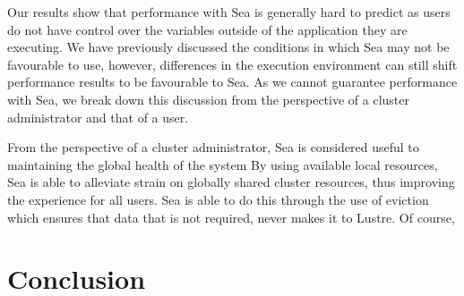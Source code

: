     Our results show that performance with Sea is generally hard to predict as users do not have control
    over the variables outside of the application they are executing. We have previously discussed the
    conditions in which Sea may not be favourable to use, however, differences in the execution environment
    can still shift performance results to be favourable to Sea. As we cannot guarantee performance with
    Sea, we break down this discussion from the perspective of a cluster administrator and that of a user.

    From the perspective of a cluster administrator, Sea is considered useful to maintaining the global health of the system By using available local resources, Sea is able to alleviate strain on
    globally shared cluster resources, thus improving the experience for all users. Sea is able to do this
    through the use of eviction which ensures that data that is not required, never makes it to Lustre. Of
    course, 
    
    
    
    
    
    
    
    
    
    \section{Conclusion}